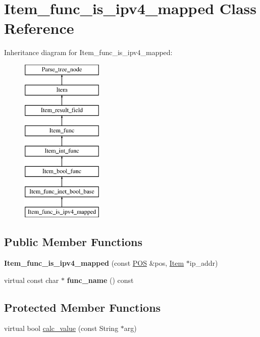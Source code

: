 \hypertarget{classItem__func__is__ipv4__mapped}{}\section{Item\+\_\+func\+\_\+is\+\_\+ipv4\+\_\+mapped Class Reference}
\label{classItem__func__is__ipv4__mapped}
Inheritance diagram for Item\+\_\+func\+\_\+is\+\_\+ipv4\+\_\+mapped\+:\begin{figure}[H]
\begin{center}
\leavevmode
\includegraphics[height=8.000000cm]{classItem__func__is__ipv4__mapped}
\end{center}
\end{figure}
\subsection*{Public Member Functions}
\begin{DoxyCompactItemize}
\item 
\mbox{\label{classItem__func__is__ipv4__mapped_ab7d322871a4deccd44f9fe706055b133}} 
{\bfseries Item\+\_\+func\+\_\+is\+\_\+ipv4\+\_\+mapped} (const \mbox{\hyperlink{structYYLTYPE}{P\+OS}} \&pos, \mbox{\hyperlink{classItem}{Item}} $\ast$ip\+\_\+addr)
\item 
\mbox{\label{classItem__func__is__ipv4__mapped_a9ba8c7c9ce67e3019e7d1277da212399}} 
virtual const char $\ast$ {\bfseries func\+\_\+name} () const
\end{DoxyCompactItemize}
\subsection*{Protected Member Functions}
\begin{DoxyCompactItemize}
\item 
virtual bool \mbox{\hyperlink{classItem__func__is__ipv4__mapped_a176329dc014077274a9468a5f84d1a23}{calc\+\_\+value}} (const String $\ast$arg)
\end{DoxyCompactItemize}
